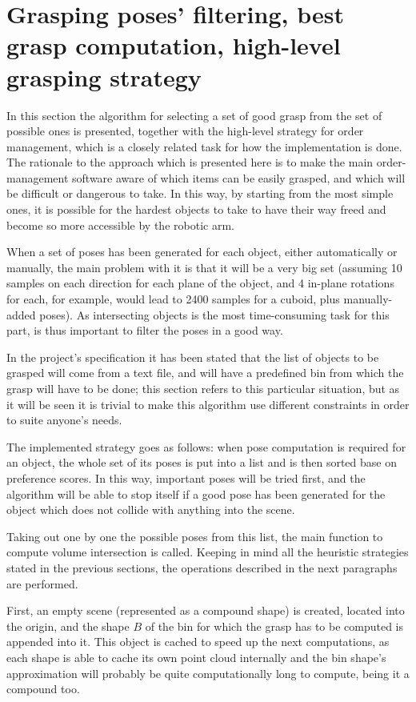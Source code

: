 \section{Grasping poses' filtering, best grasp computation, high-level
  grasping strategy} 
In this section the algorithm for selecting a set of good grasp from the set of
possible ones is presented, together with the high-level strategy for
order management, which is a closely related task for how the
implementation is done. The rationale to the  approach which is
presented here is to make the main order-management software aware of
which items can be easily grasped, and which will be difficult or
dangerous to take. In this way, by starting from the most simple ones,
it is possible for the hardest objects to take to have their way
freed and become so more accessible by the robotic arm.

When a set of poses has been generated for each object, either automatically or
manually, the main problem with it is that it will be a very big set (assuming
10 samples on each direction for each plane of the object, and 4 in-plane
rotations for each, for example, would
lead to 2400 samples for a cuboid, plus manually-added poses). As intersecting
objects is the most time-consuming task for this part, is thus
important to filter the poses in a good way.

In the project's specification it has been stated that the list of
objects to be grasped will come from a text file, and will have a
predefined bin from which the grasp will have to be done; this section
refers to this particular situation, but as it will be seen it is
trivial to make this algorithm use different constraints in order to
suite anyone's needs.

The implemented strategy goes as follows: when pose computation is required for an object,  the whole set of
its poses is put into a list and is then sorted base on preference
scores.
In this way, important poses will be tried first, and the
algorithm will be able to stop itself if a good pose has been
generated for the object which does not collide with anything into the
scene.

Taking out one by one the possible poses from this list, the main
function to compute volume intersection is called. Keeping in mind all
the heuristic strategies stated in the previous sections, the
operations described in the next paragraphs are performed.

First, an empty scene (represented as a compound shape) is created,
located into the origin, and the shape $B$ of the bin for which the grasp has to be computed
is appended into it. This object is cached to speed up the next
computations, as each shape is able to cache its own point cloud
internally and the bin shape's approximation will probably be quite computationally
long to compute, being it a compound too.

